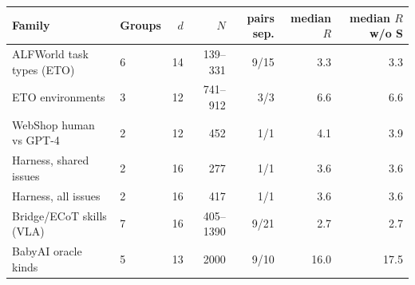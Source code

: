 \begin{tabular}{@{}llrrrrr@{}}
\toprule
Family & Groups & $d$ & $N$ & pairs sep. & median $R$ & median $R$ w/o S \\
\midrule
ALFWorld task types (ETO) & 6 & 14 & 139--331 & 9/15 & 3.3 & 3.3 \\
ETO environments & 3 & 12 & 741--912 & 3/3 & 6.6 & 6.6 \\
WebShop human vs GPT-4 & 2 & 12 & 452 & 1/1 & 4.1 & 3.9 \\
Harness, shared issues & 2 & 16 & 277 & 1/1 & 3.6 & 3.6 \\
Harness, all issues & 2 & 16 & 417 & 1/1 & 3.6 & 3.6 \\
Bridge/ECoT skills (VLA) & 7 & 16 & 405--1390 & 9/21 & 2.7 & 2.7 \\
BabyAI oracle kinds & 5 & 13 & 2000 & 9/10 & 16.0 & 17.5 \\
\bottomrule
\end{tabular}
